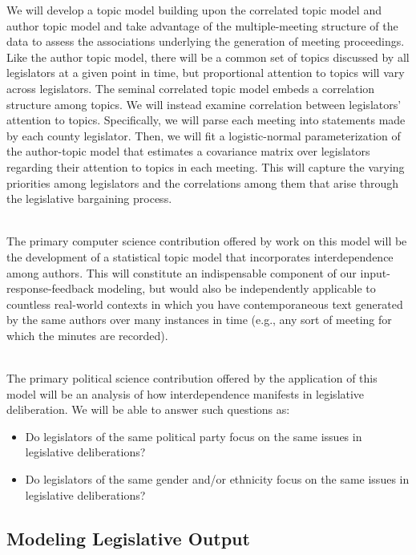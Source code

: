 We will develop a topic model building upon the correlated topic model \cite{Blei2005} and author topic model \cite{Steyvers2004} and take advantage of the multiple-meeting structure of the data to assess the associations underlying the generation of meeting proceedings. Like the author topic model,  there will be a common set of topics discussed by all legislators at a given point in time, but proportional attention to topics will vary across legislators. The seminal correlated topic model embeds a correlation structure among topics. We will instead examine correlation between legislators' attention to topics. Specifically, we will parse each meeting into statements made by each county legislator. Then, we will fit a logistic-normal parameterization of the author-topic model that estimates a covariance matrix over legislators regarding their attention to topics in each meeting. This will capture the varying priorities among legislators and the correlations among them that arise through the legislative bargaining process.

~\\
 The primary computer science contribution offered by work on this model will be the development of a statistical topic model that incorporates interdependence among authors. This will constitute an indispensable component of our input-response-feedback modeling, but would also be independently applicable to countless real-world contexts in which you have contemporaneous text generated by the same authors over many instances in time (e.g., any sort of meeting for which the minutes are recorded).

~\\
 The primary political science contribution offered by the application of this model will be an analysis of how interdependence manifests in legislative deliberation. We will be able to answer such questions as:
\begin{itemize}
\item Do legislators of the same political party focus on the same issues in legislative deliberations?
\item Do legislators of the same gender and/or ethnicity focus on the same issues in legislative deliberations?
\end{itemize}


\subsection{Modeling Legislative Output}

